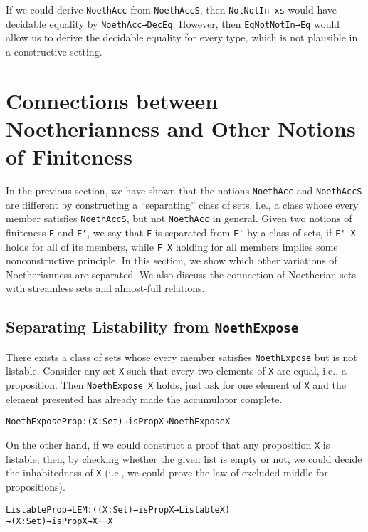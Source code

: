 \documentclass{eptcs}
\begin{document}
If we could derive \verb;NoethAcc; from \verb;NoethAccS;, then
\verb;NotNotIn xs; would have decidable equality by
\verb;NoethAcc→DecEq;. However, then \verb;EqNotNotIn→Eq; would allow us to
derive the decidable equality for every type, which is not plausible in a
constructive setting.


\section{Connections between Noetherianness and Other Notions of Finiteness}
\label{connections-between-notions-of-finiteness}

In the previous section, we have shown that the notions \verb;NoethAcc; and
\verb;NoethAccS; are different by constructing a ``separating'' class of sets, i.e., a class whose every member
satisfies \verb;NoethAccS;, but not \verb;NoethAcc; in general.  Given two notions of
finiteness \verb;F; and \verb;F';, we say that \verb;F; is separated from
\verb;F'; by a class of sets, if \verb;F' X; holds for all of its members, while \verb;F X; holding for all members implies some
nonconstructive principle. In this section, we show which other variations of
Noetherianness are separated. We also discuss the connection of Noetherian sets
with streamless sets and almost-full relations.


\subsection{Separating Listability from \texttt{NoethExpose}}
\label{separating-noethexpose-from-listability}

There exists a class of sets whose every member satisfies
\verb;NoethExpose; but is not listable. Consider any set \verb;X; such that
every two elements of \verb;X; are equal, i.e., a proposition. Then
\verb;NoethExpose X; holds, just ask for one element of \verb;X; and the element presented has already made the accumulator complete.
\begin{alltt}
NoethExposeProp : (X : Set) → isProp X → NoethExpose X
\end{alltt}
On the other hand, if we could construct a proof that any proposition \verb;X;
is listable, then, by checking whether the given list is empty or not, we could decide
the inhabitedness of \verb;X; (i.e., we could prove the law of excluded middle
for propositions).
\begin{alltt}
ListableProp→LEM : ((X : Set) → isProp X → Listable X)
  → (X : Set) → isProp X → X + ¬ X
\end{alltt}
\end{document}
